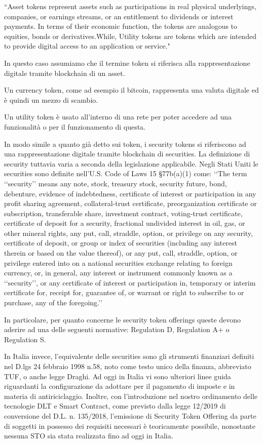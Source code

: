 “Asset tokens represent assets such as participations in real physical underlyings, companies, or earnings streams, or an entitlement to dividends or interest payments. In terms of their economic function, the tokens are analogous to equities, bonds or derivatives.While, Utility tokens are tokens which are intended to provide digital access to an application or service."

In questo caso assumiamo che il termine token si riferisca alla rappresentazione digitale tramite blockchain di un asset.

Un currency token, come ad esempio il bitcoin, rappresenta una valuta digitale ed è quindi un mezzo di scambio.

Un utility token è usato all'interno di una rete per poter accedere ad una funzionalità o per il funzionamento di questa. 

In modo simile a quanto già detto sui token, i security tokens si riferiscono ad una rappresentazione digitale tramite blockchain di securities. La definizione di security tuttavia varia a seconda della legislazione applicabile.
Negli Stati Uniti le securities sono definite nell'U.S. Code of Laws 15 §77b(a)(1) come:
‘‘The term ‘‘security’’ means any note, stock, treasury stock, security future, bond, debenture, evidence of indebtedness, certificate of interest or participation in any profit sharing agreement, collateral-trust certificate, preorganization certificate or subscription, transferable share, investment
contract, voting-trust certificate, certificate of deposit for a security, fractional undivided interest in oil, gas, or other mineral rights, any put, call, straddle, option, or privilege on any security, certificate of deposit, or group or index of securities (including any interest therein or based on the value thereof), or any put, call, straddle, option, or privilege entered into on a national securities exchange relating to foreign currency, or, in general, any interest or instrument commonly known as a ‘‘security’’, or any certificate of interest or participation in, temporary or interim certificate for, receipt for, guarantee of, or warrant or right to subscribe to or purchase, any of the foregoing.’’

In particolare, per quanto concerne le security token offerings queste devono aderire ad una delle seguenti normative: Regulation D, Regulation A+ o Regulation S\cite{K31,K32,k33}. 

In Italia invece, l'equivalente delle securities sono gli strumenti finanziari definiti nel D.lgs 24 febbraio 1998 n.58, noto come testo unico della finanza, abbreviato TUF, o anche legge Draghi\cite{K34}. Ad oggi in Italia vi sono ulteriori linee guida riguardanti la configurazione da adottare per il pagamento di imposte e in materia di antiriciclaggio. Inoltre, con l'introduzione nel nostro ordinamento delle tecnologie DLT e Smart Contract, come previsto dalla legge 12/2019 di conversione del D.L. n. 135/2018, l'emissione di Security Token Offering da parte di soggetti in possesso dei requisiti necessari è teoricamente possibile, nonostante nessuna STO sia stata realizzata fino ad oggi in Italia.


